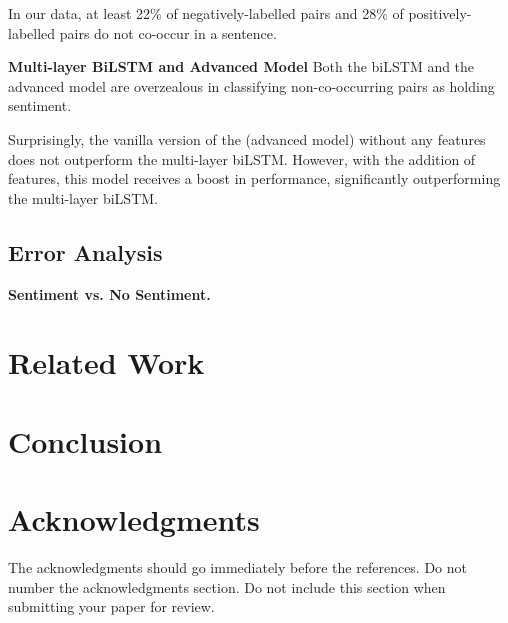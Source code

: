 \documentclass[11pt,a4paper]{article}
\begin{document}
In our data, at least 22\% of negatively-labelled pairs and 28\% of positively-labelled pairs do not co-occur in a sentence.

\noindent\textbf{Multi-layer BiLSTM and Advanced Model} %
Both the biLSTM and the advanced model are overzealous in classifying non-co-occurring pairs as holding sentiment. %

Surprisingly, the vanilla version of the (advanced model) without any features does not outperform the multi-layer biLSTM.
However, with the addition of features, this model receives a boost in performance, significantly outperforming the multi-layer biLSTM.


\subsection{Error Analysis}
\noindent\textbf{Sentiment vs. No Sentiment.}

\section{Related Work}

\section{Conclusion}

\section*{Acknowledgments}
The acknowledgments should go immediately before the references.  Do
not number the acknowledgments section. Do not include this section
when submitting your paper for review. \\
\end{document}
